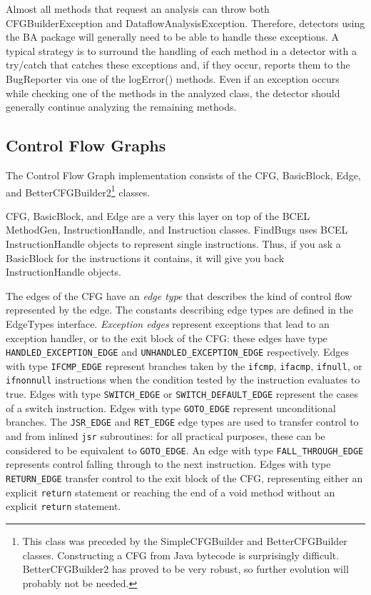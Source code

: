 \documentclass[11pt]{article}
\begin{document}
Almost all methods that request an analysis can throw both CFGBuilderException
and DataflowAnalysisException.  Therefore, detectors using the BA package will generally need to
be able to handle these exceptions.  A typical strategy is to surround the
handling of each method in a detector with a try/catch that catches these exceptions and,
if they occur,
reports them to the BugReporter via one of the logError() methods.
Even if an exception occurs
while checking one of the methods in the analyzed class, the detector should generally continue
analyzing the remaining methods.

\subsection{Control Flow Graphs}

The Control Flow Graph implementation consists of the CFG, BasicBlock, Edge,
and BetterCFGBuilder2\footnote{This class was preceded by the
SimpleCFGBuilder and BetterCFGBuilder classes.  Constructing a CFG from
Java bytecode is surprisingly difficult.  BetterCFGBuilder2 has proved
to be very robust, so further evolution will probably not be needed.} classes.

CFG, BasicBlock, and Edge are a very this layer on top of the BCEL MethodGen,
InstructionHandle, and Instruction classes.  FindBugs uses BCEL InstructionHandle
objects to represent single instructions.  Thus, if you ask a BasicBlock
for the instructions it contains, it will give you back InstructionHandle
objects.

The edges of the CFG have an {\em edge type} that describes the kind
of control flow represented by the edge.
The constants describing edge types are defined in the EdgeTypes interface.
{\em Exception edges} represent
exceptions that lead to an exception handler, or to the exit block of the
CFG: these edges have type {\tt HANDLED\_EXCEPTION\_EDGE} and
{\tt UNHANDLED\_EXCEPTION\_EDGE} respectively.
Edges with type {\tt IFCMP\_EDGE} represent branches taken by
the {\tt ifcmp}, {\tt ifacmp}, {\tt ifnull}, or {\tt ifnonnull}
instructions when the condition tested by the instruction
evaluates to true.
Edges with type {\tt SWITCH\_EDGE} or {\tt SWITCH\_DEFAULT\_EDGE} represent
the cases of a switch instruction.
Edges with type {\tt GOTO\_EDGE} represent unconditional branches.
The {\tt JSR\_EDGE} and {\tt RET\_EDGE} edge types are used to transfer control
to and from inlined {\tt jsr} subroutines: for all practical purposes,
these can be considered to be equivalent to {\tt GOTO\_EDGE}.
An edge with type {\tt FALL\_THROUGH\_EDGE}
represents control falling through to the next instruction.
Edges with type {\tt RETURN\_EDGE} transfer control to the exit block
of the CFG, representing either an explicit {\tt return} statement or
reaching the end of a void method without an explicit {\tt return}
statement.
\end{document}
